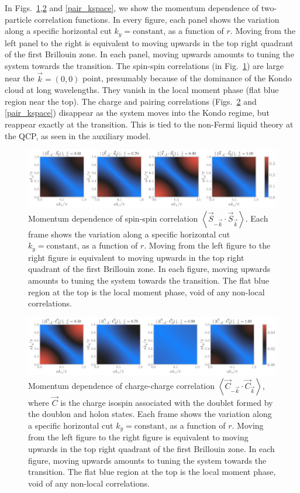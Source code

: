 \documentclass[prb]{revtex4-2}
\begin{document}
In Figs.~\ref{spin_kspace},\ref{charge_kspace} and \ref{pair_kspace}, we show the momentum dependence of two-particle correlation functions. In every figure, each panel shows the variation along a specific horizontal cut \(k_y=\text{constant}\), as a function of \(r\). Moving from the left panel to the right is equivalent to moving upwards in the top right quadrant of the first Brillouin zone. In each panel, moving upwards amounts to tuning the system towards the transition. The spin-spin correlations (in Fig.~\ref{spin_kspace}) are large near the \(\vec k = \left( 0,0 \right) \) point, presumably because of the dominance of the Kondo cloud at long wavelengths. They vanish in the local moment phase (flat blue region near the top). The charge and pairing correlations (Figs.~\ref{charge_kspace} and \ref{pair_kspace}) disappear as the system moves into the Kondo regime, but reappear exactly at the transition. This is tied to the non-Fermi liquid theory at the QCP, as seen in the auxiliary model.
\begin{figure}[!htb]
\centering
\includegraphics[width=\textwidth]{spin_rspace_all.pdf}
\caption{Momentum dependence of spin-spin correlation \(\left<\vec{S}_{-\vec k}\cdot\vec{S}_{\vec k} \right>\). Each frame shows the variation along a specific horizontal cut \(k_y=\text{constant}\), as a function of \(r\). Moving from the left figure to the right figure is equivalent to moving upwards in the top right quadrant of the first Brillouin zone. In each figure, moving upwards amounts to tuning the system towards the transition. The flat blue region at the top is the local moment phase, void of any non-local correlations.}
\label{spin_kspace}
\end{figure}

\begin{figure}[!htb]
\centering
\includegraphics[width=\textwidth]{charge_rspace_all.pdf}
\caption{Momentum dependence of charge-charge correlation \(\left<\vec{C}_{-\vec k}\cdot\vec{C}_{\vec k} \right>\), where \(\vec C\) is the charge isospin associated with the doublet formed by the doublon and holon states. Each frame shows the variation along a specific horizontal cut \(k_y=\text{constant}\), as a function of \(r\). Moving from the left figure to the right figure is equivalent to moving upwards in the top right quadrant of the first Brillouin zone. In each figure, moving upwards amounts to tuning the system towards the transition. The flat blue region at the top is the local moment phase, void of any non-local correlations.}
\label{charge_kspace}
\end{figure}
\end{document}
